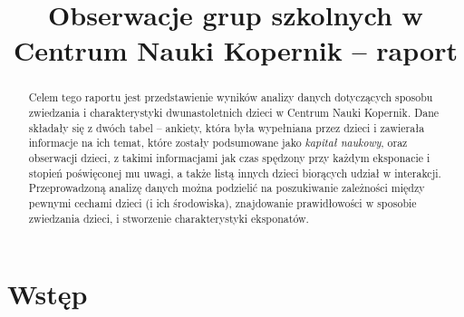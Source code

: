 \documentclass[conference]{IEEEtran}
\begin{document}
%
\title{Obserwacje grup szkolnych w Centrum Nauki Kopernik -- raport}


\author{
}

\maketitle


\begin{abstract}
Celem tego raportu jest przedstawienie wyników analizy danych dotyczących sposobu zwiedzania i charakterystyki dwunastoletnich dzieci w Centrum Nauki Kopernik. Dane składały się z dwóch tabel -- ankiety, która była wypełniana przez dzieci i zawierała informacje na ich temat, które zostały podsumowane jako \textit{kapitał naukowy}, oraz obserwacji dzieci, z takimi informacjami jak czas spędzony przy każdym eksponacie i stopień poświęconej mu uwagi, a także listą innych dzieci biorących udział w interakcji. Przeprowadzoną analizę danych można podzielić na poszukiwanie zależności między pewnymi cechami dzieci (i ich środowiska), znajdowanie prawidłowości w sposobie zwiedzania dzieci, i stworzenie charakterystyki eksponatów.
\end{abstract}
\IEEEpeerreviewmaketitle



\section{Wstęp}
\end{document}

